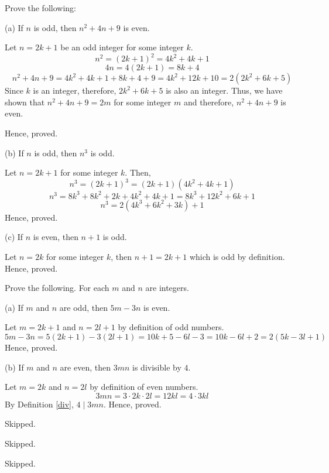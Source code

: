 \begin{problem}
	Prove the following:

	(a) If $n$ is odd, then $n^2 + 4n + 9$ is even.
	\begin{solution}
		Let $n = 2k+1$ be an odd integer for some integer $k$.
		$$n^2 = (2k+1)^2 = 4k^2 + 4k + 1$$
		$$4n = 4(2k+1) = 8k + 4$$
		$$n^2 + 4n + 9 = 4k^2 + 4k + 1 + 8k + 4 + 9 = 4k^2 + 12k + 10 = 2(2k^2+6k+5)$$
		Since $k$ is an integer, therefore, $2k^2+6k+5$ is also an integer. Thus, we have shown that $n^2 + 4n + 9 = 2m$ for some integer $m$ and therefore, $n^2 + 4n + 9$ is even.

		Hence, proved.
	\end{solution}
	
	(b) If $n$ is odd, then $n^3$ is odd.
	\begin{solution}
		Let $n = 2k+1$ for some integer $k$. Then,
		$$n^3 = (2k+1)^3 = (2k+1)(4k^2+4k+1)$$
		$$n^3 = 8k^3+8k^2+2k+4k^2+4k+1 = 8k^3 + 12k^2 + 6k + 1$$
		$$n^3 = 2(4k^3+6k^2+3k) + 1$$
		Hence, proved.
	\end{solution}

	(c) If $n$ is even, then $n+1$ is odd.
	\begin{solution}
		Let $n = 2k$ for some integer $k$, then $n+1 = 2k+1$ which is odd by definition. Hence, proved.
	\end{solution}
\end{problem}

\begin{problem}
	Prove the following. For each $m$ and $n$ are integers.

	(a) If $m$ and $n$ are odd, then $5m-3n$ is even.
	\begin{solution}
		Let $m = 2k+1$ and $n = 2l+1$ by definition of odd numbers.
		$$5m-3n = 5(2k+1)-3(2l+1) = 10k+5-6l-3 = 10k-6l+2 = 2(5k-3l+1)$$
		Hence, proved.
	\end{solution}

	(b) If $m$ and $n$ are even, then $3mn$ is divisible by $4$.
	\begin{solution}
		Let $m = 2k$ and $n = 2l$ by definition of even numbers.
		$$3mn = 3 \cdot 2k \cdot 2l = 12kl = 4 \cdot  3kl$$
		By Definition \ref{div}, $4 \mid 3mn$. Hence, proved.
	\end{solution}
\end{problem}

\begin{problem}Skipped.\end{problem}
\begin{problem}Skipped.\end{problem}
\begin{problem}Skipped.\end{problem}

